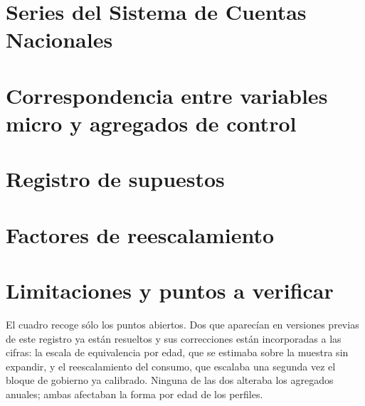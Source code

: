\documentclass[11pt,a4paper]{article}
\begin{document}
\appendix
\section{Series del Sistema de Cuentas Nacionales}
\label{anexo:series}

\FloatBarrier
\section{Correspondencia entre variables micro y agregados de control}
\label{anexo:mapeo}


\FloatBarrier
\section{Registro de supuestos}
\label{anexo:supuestos}

\FloatBarrier
\section{Factores de reescalamiento}
\label{anexo:lambda}

\FloatBarrier
\section{Limitaciones y puntos a verificar}
\label{anexo:limitaciones}

\FloatBarrier
\noindent El cuadro recoge sólo los puntos abiertos. Dos que aparecían en versiones previas de
este registro ya están resueltos y sus correcciones están incorporadas a las cifras: la escala de
equivalencia por edad, que se estimaba sobre la muestra sin expandir, y el reescalamiento del
consumo, que escalaba una segunda vez el bloque de gobierno ya calibrado. Ninguna de las dos
alteraba los agregados anuales; ambas afectaban la forma por edad de los perfiles.


\end{document}
